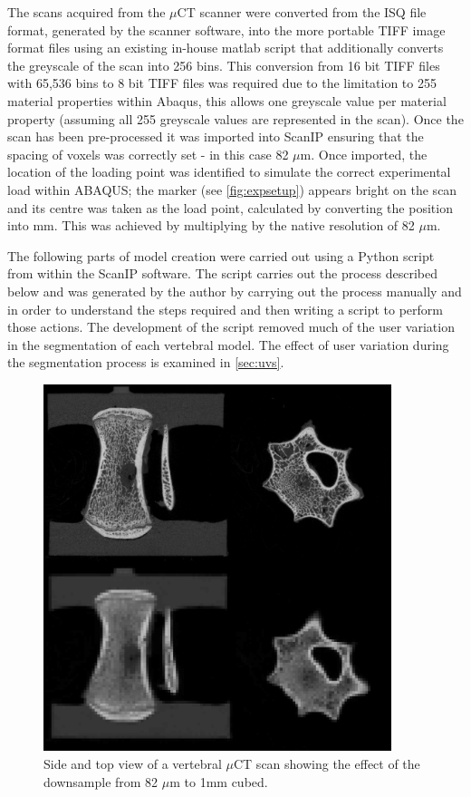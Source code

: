 The scans acquired from the \(\mu\)CT scanner were converted from the ISQ file
format, generated by the scanner software, into the more portable TIFF image
format files using an existing in-house  matlab script that additionally
converts the greyscale of the scan into 256 bins. This conversion from 16 bit
TIFF files with 65,536 bins to 8 bit TIFF files was required due to the
limitation to 255 material properties within Abaqus, this allows one greyscale
value per material property (assuming all 255 greyscale values are represented
in the scan). Once the scan has been pre-processed it was imported into ScanIP
ensuring that the spacing of voxels was correctly set - in this case 82
\(\mu\)m.  Once imported, the location of the loading point was identified to
simulate the correct experimental load within ABAQUS; the marker (see
\cref{fig:expsetup}) appears bright on the scan and its centre was taken as the
load point, calculated by converting the position into mm. This was achieved by
multiplying by the native resolution of 82 \(\mu\)m.

The following parts of model creation were carried out using a Python script
from within the ScanIP software. The script carries out the process described
below and was generated by the author by carrying out the process manually and
in order to understand the steps required and then writing a script to perform
those actions. The development of the script removed much of the user variation
in the segmentation of each vertebral model. The effect of user variation
during the segmentation process is examined in \cref{sec:uvs}.

\begin{figure}[ht!]
\centering
  \includegraphics[width=4in]{images/compofDownsample.png}
  \caption{Side and top view of a vertebral $\mu$CT scan showing the effect of the downsample from 82 $\mu$m to 1mm cubed.}
\label{fig:compofDownsample}
\end{figure}




